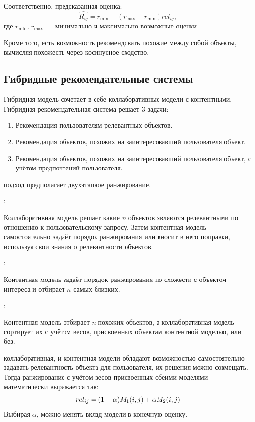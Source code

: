 Соответственно, предсказанная оценка:
\begin{equation}\label{eq:content-user-rating}
        \hat{R_{ij}} = r_{\min} + (r_{\max} - r_{\min}) rel_{ij},
\end{equation}
где $r_{\min}$, $r_{\max}$ --- минимально и максимально возможные оценки.

Кроме того, есть возможность рекомендовать похожие между собой объекты, вычисляя похожесть через косинусное сходство.
\pagebreak

\subsection{Гибридные рекомендательные системы}\label{subsec:hybrid_rec_systems}
Гибридная модель сочетает в себе коллаборативные модели с контентными.
Гибридная рекомендательная система решает 3 задачи:
\begin{enumerate}
    \item Рекомендация пользователям релевантных объектов.
    \item Рекомендация объектов, похожих на заинтересовавший пользователя объект.
    \item Рекомендация объектов, похожих на заинтересовавший пользователя объект, с учётом предпочтений пользователя.
\end{enumerate}

 подход предполагает двухэтапное ранжирование.

:
\begin{addmargin}[2em]{1em}%
Коллаборативная модель решает какие $n$ объектов являются релевантными по отношению к пользовательскому запросу.
Затем контентная модель самостоятельно задаёт порядок ранжирования или вносит в него поправки, используя свои знания о релевантности объектов.
\end{addmargin}

:
\begin{addmargin}[2em]{1em}%
Контентная модель задаёт порядок ранжирования по схожести с объектом интереса и отбирает $n$ самых близких.
\end{addmargin}

:
\begin{addmargin}[2em]{1em}%
Контентная модель отбирает $n$ похожих объектов, а коллаборативная модель сортирует их с учётом весов, присвоенных объектам контентной моделью, или без.
\end{addmargin}

 коллаборативная, и контентная модели обладают возможностью самостоятельно задавать релевантность объекта для пользователя, их решения можно совмещать.
Тогда ранжирование с учётом весов присвоенных обеими моделями математически выражается так:
\begin{equation}\label{eq:hybrid}
rel_{ij} = (1 - \alpha)\space M_1(i, j) + \alpha\space M_2(i, j)
\end{equation}
Выбирая $\alpha$, можно менять вклад модели в конечную оценку.
